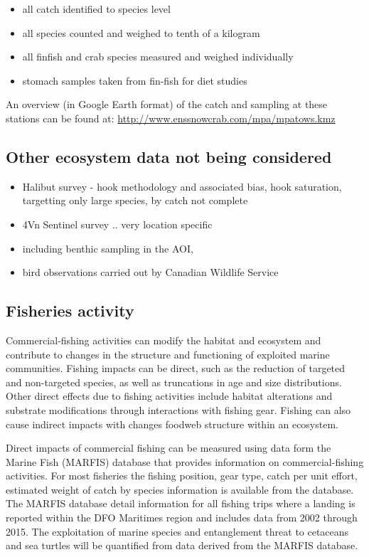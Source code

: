\documentclass[letterpaper,portrait,11pt]{scrartcl}
\numberwithin{equation}{section}		%
\numberwithin{figure}{section}		%
\numberwithin{table}{section}				%
\begin{document}
\begin{itemize}
  \item all catch identified to species level
  \item all species counted and weighed to tenth of a kilogram
  \item all finfish and crab species measured and weighed individually
  \item stomach samples taken from fin-fish for diet studies
\end{itemize}

An overview (in Google Earth format) of the catch and sampling at these stations can be found at: \url{http://www.enssnowcrab.com/mpa/mpatows.kmz}

\subsection{Other ecosystem data not being considered}
\begin{itemize}
   \item Halibut survey - hook methodology and associated bias, hook saturation, targetting only large species, by catch not complete 
   \item 4Vn Sentinel survey .. very location specific
   \item including benthic sampling in the AOI, 
   \item bird observations carried out by Canadian Wildlife Service
\end{itemize}	
  
\clearpage

\subsection{Fisheries activity}
Commercial-fishing activities can modify the habitat and ecosystem and contribute to changes in the structure and functioning of exploited marine communities.  Fishing impacts can be direct, such as the reduction of targeted and non-targeted species, as well as truncations in age and size distributions.  Other direct effects due to fishing activities include habitat alterations and substrate modifications through interactions with fishing gear. Fishing can also cause indirect impacts with changes foodweb structure within an ecosystem.  

Direct impacts of commercial fishing can be measured using data form the Marine Fish (MARFIS) database that provides information on commercial-fishing activities.  For most fisheries the fishing position, gear type, catch per unit effort, estimated weight of catch by species information is available from the database. The MARFIS database detail information for all fishing trips where a landing is reported within the DFO Maritimes region and includes data from 2002 through 2015.    The exploitation of marine species and entanglement threat to cetaceans and sea turtles will be quantified from data derived from the MARFIS database.
   
\end{document}

